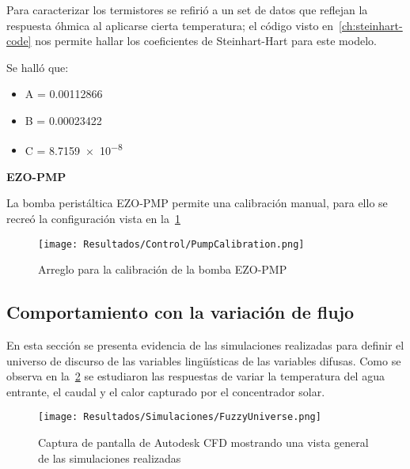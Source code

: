 			Para caracterizar los termistores se refirió a un set de datos que reflejan la respuesta óhmica al aplicarse cierta temperatura; el código visto en~\cref{ch:steinhart-code} nos permite hallar los coeficientes de Steinhart-Hart para este modelo.
			
			Se halló que:
			
			\begin{itemize}[columns=3]
				\item A = \num{0.00112866}
				\item B = \num{0.00023422}
				\item C = \num{8.7159e-8}
			\end{itemize}
			
			\textbf{EZO-PMP}\par
			
			La bomba peristáltica EZO-PMP permite una calibración manual, para ello se recreó la configuración vista en la~\cref{fig:Calibración-bomba}
			
			\begin{figure}[H]
				\centering
				\texttt{[image: Resultados/Control/PumpCalibration.png]}
				\caption{Arreglo para la calibración de la bomba EZO-PMP}
				\label{fig:Calibración-bomba}
			\end{figure}
		
		\subsection{Comportamiento con la variación de flujo}
				
				En esta sección se presenta evidencia de las simulaciones realizadas para definir el universo de discurso de las variables lingüísticas de las variables difusas. Como se observa en la~\cref{fig:FuzzyUniverse} se estudiaron las respuestas de variar la temperatura del agua entrante, el caudal y el calor capturado por el concentrador solar.
								
				\begin{figure}[H]
					\centering
					\texttt{[image: Resultados/Simulaciones/FuzzyUniverse.png]}
					\caption{Captura de pantalla de Autodesk CFD mostrando una vista general de las simulaciones realizadas}
					\label{fig:FuzzyUniverse}
				\end{figure}
								
